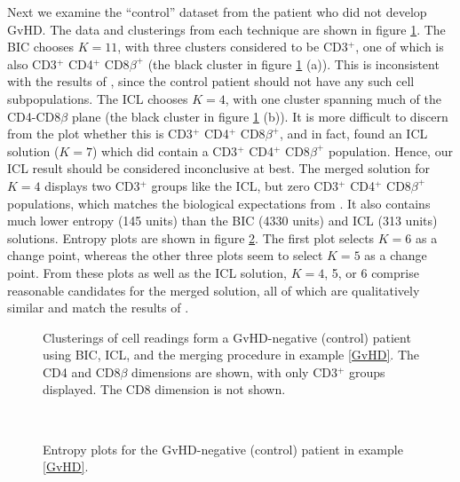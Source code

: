 \documentclass{uwstat572}
\renewcommand\;{\,}
\begin{document}
Next we examine the ``control'' dataset from the patient who did not develop GvHD.
The data and clusterings from each technique are shown in figure \ref{control}.
The BIC chooses $K = 11$, with three clusters considered to be CD3$^+$, one of which is also CD3$^+$ CD4$^+$ CD8$\beta^+$ (the black cluster in figure \ref{control} (a)).
This is inconsistent with the results of \cite{Brinkman07}, since the control patient should not have any such cell subpopulations.
The ICL chooses $K = 4$, with one cluster spanning much of the CD4-CD8$\beta$ plane (the black cluster in figure \ref{control} (b)).
It is more difficult to discern from the plot whether this is CD3$^+$ CD4$^+$ CD8$\beta^+$, and in fact, \cite{Baudry10} found an ICL solution ($K = 7$) which did contain a CD3$^+$ CD4$^+$ CD8$\beta^+$ population.
Hence, our ICL result should be considered inconclusive at best.
The merged solution for $K = 4$ displays two CD3$^+$ groups like the ICL, but zero CD3$^+$ CD4$^+$ CD8$\beta^+$ populations, which matches the biological expectations from \cite{Brinkman07}.
It also contains much lower entropy (145 units) than the BIC (4330 units) and ICL (313 units) solutions.
Entropy plots are shown in figure \ref{Entropy5_2}.
The first plot selects $K = 6$ as a change point, whereas the other three plots seem to select $K = 5$ as a change point.
From these plots as well as the ICL solution, $K = 4$, 5, or 6 comprise reasonable candidates for the merged solution, all of which are qualitatively similar and match the results of \cite{Brinkman07}.

\begin{figure}
\begin{center}
\end{center}
\caption{Clusterings of cell readings form a GvHD-negative (control) patient using BIC, ICL, and the merging procedure in example \ref{GvHD}. The CD4 and CD8$\beta$ dimensions are shown, with only CD3$^+$ groups displayed. The CD8 dimension is not shown.}
\label{positive}
\label{control}
\end{figure}

\begin{figure}
\begin{center}
\\
\end{center}
\caption{Entropy plots for the GvHD-negative (control) patient in example \ref{GvHD}.}
\label{Entropy5_2}
\end{figure}
\end{document}
